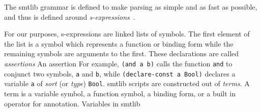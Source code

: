 The \ac{smtlib} grammar is defined to make parsing as simple and as fast
as possible, and thus is defined around
\emph{s-expressions}~\cite{10.1145/367177.367199}.


For our purposes,
s-expressions are linked lists of symbols. The first element of the list is a
symbol which represents a function or binding form while the remaining symbols
are arguments to the first.  These declarations are called
\emph{assertions} An assertion For example, \lstinline{(and a b)} calls the
function \lstinline{and} to conjunct two symbols, \lstinline{a} and
\lstinline{b}, while \lstinline{(declare-const a Bool)} declares a variable
\lstinline{a} of \emph{sort} (or \emph{type}) \lstinline{Bool}. \ac{smtlib}
scripts are constructed out of \emph{terms}. A term is a variable symbol, a
function symbol, a binding form, or a built in operator for annotation.
Variables in \ac{smtlib}



